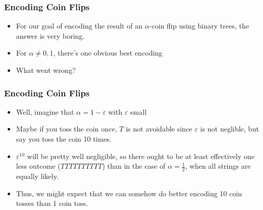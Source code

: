 \documentclass[xcolor=dvipsnames]{beamer}
\begin{document}
	\begin{frame}
	\frametitle{Encoding Coin Flips}
	    \begin{itemize}
	        \item For our goal of encoding the result of an $\alpha$-coin flip using binary trees, the answer is very boring. 
	        \item For $\alpha \neq 0, 1$, there's one obvious best encoding
	        \begin{center}
	        \end{center}
	        \item What went wrong?
	    \end{itemize}
	\end{frame}
	
	\begin{frame}
	\frametitle{Encoding Coin Flips}
    	\begin{itemize}
    	    \item Well, imagine that $\alpha = 1 - \varepsilon$ with $\varepsilon$ small
    	    \pause
    	    \item Maybe if you toss the coin once, $T$ is not avoidable since $\varepsilon$ is not neglible, but say you toss the coin 10 times. 
    	    \item $\varepsilon^{10}$ will be pretty well negligible, so there ought to be at least effectively one less outcome ($TTTTTTTTTT$) than in the case of $\alpha = \frac{1}{2}$, when all strings are equally likely.
    	    \pause
    	    \item Thus, we might expect that we can somehow do better encoding 10 coin tosses than 1 coin toss. 
    	\end{itemize}
	\end{frame}
	
\end{document}
